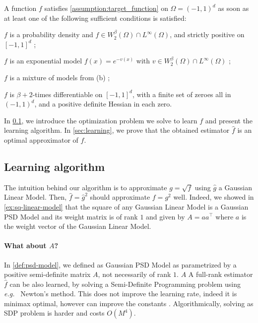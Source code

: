 \begin{proposition}\label{prop:sufficient-conditions-target}
A function $f$ satisfies \cref{assumption:target_function} on $\Omega = (-1, 1)^d$ as soon as at least one of the following sufficient conditions is satisfied:
\begin{enumthm}
    \item $f$ is a probability density and $f\in W_2^\beta(\Omega)\cap L^\infty(\Omega)$, and strictly positive on $[-1, 1]^d$ ;
    \item $f$ is an exponential model $f(x) = e^{-v(x)}$ with $v\in W_2^\beta(\Omega) \cap L^\infty(\Omega)$ ;
    \item $f$ is a mixture of models from (b) ;
    \item $f$ is $\beta+2$-times differentiable on $[-1, 1]^d$, with a finite set of zeroes all in $(-1, 1)^d$, and a positive definite Hessian in each zero.
\end{enumthm}
\end{proposition}

In \cref{sec:optimization}, we introduce the optimization problem we solve to learn $f$ and present the learning algorithm. In \cref{sec:learning}, we prove that the obtained estimator $\hat f$ is an optimal approximator of $f$.

\subsection{Learning algorithm}\label{sec:optimization}
The intuition behind our algorithm is to approximate $g=\sqrt{f}$ using $\hat g$ a Gaussian Linear Model. Then, $\hat f = \hat g^2$ should approximate $f=g^2$ well. Indeed, we showed in \cref{ex:sq-linear-model} that the square of any Gaussian Linear Model is a Gaussian PSD Model and its weight matrix is of rank $1$ and given by $A =aa^\top $ where $a$ is the weight vector of the Gaussian Linear Model.

\paragraph{What about $A$?} In \cref{def:psd-model}, we defined as Gaussian PSD Model as parametrized by a positive semi-definite matrix $A$, not necessarily of rank $1$. $A$ A full-rank estimator $\hat f$ can be also learned, by solving a Semi-Definite Programming problem using \emph{e.g.\ } Newton's method. This does not improve the learning rate, indeed it is minimax optimal, however can improve the constants . Algorithmically, solving as SDP problem is harder and costs $O(M^4)$.


